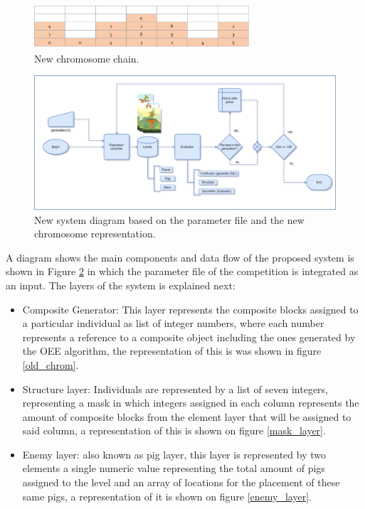 \documentclass[conference]{IEEEtran}
\begin{document}
    \begin{figure}[htbp]
    \centerline{\includegraphics[width=80mm]{Images/chromosome_chain_new_model.png}}
    \caption{New chromosome chain.}
    \label{new_chrom}
    \end{figure}
    \begin{figure}[htbp]
    \centerline{\includegraphics[width=160mm]{Images/new_model_v2.png}}
    \caption{New system diagram based on the parameter file and the new chromosome representation.}
    \label{new_model}
    \end{figure}
    
    A diagram shows the main components and data flow of the proposed system
    is shown in Figure \ref{new_model} in which the parameter file of the competition 
    is integrated as an input. The layers of the system is explained next:
    
    \begin{itemize}
        \item Composite Generator:  This layer represents the composite blocks
        assigned to a particular individual as list of integer numbers, where
        each number represents a reference to a composite object including the
        ones generated by the OEE algorithm, the representation of this is was
        shown in figure \ref{old_chrom}.
        \item Structure layer: Individuals are represented by a list of seven
        integers, representing a mask in which integers assigned in each column
        represents the amount of composite blocks from the element layer that
        will be assigned to said column, a representation of this is shown on
        figure \ref{mask_layer}.
        \item Enemy layer: also known as pig layer, this layer is represented by
        two elements a single numeric value representing the total amount of
        pigs assigned to the level and an array of locations for the placement
        of these same pigs, a representation of it is shown on figure
        \ref{enemy_layer}. 
    \end{itemize}
    
\end{document}
